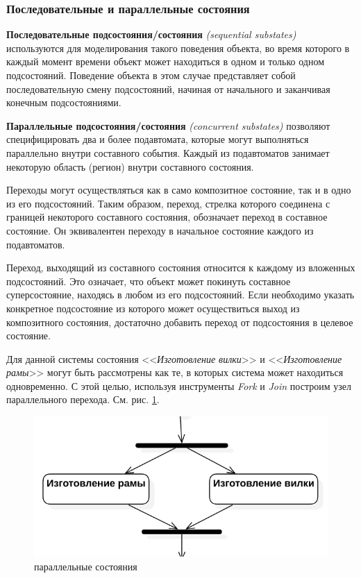 \documentclass[a4paper,12pt]{report}
\begin{document}
\subsubsection*{Последовательные и параллельные состояния}

\textbf{Последовательные подсостояния/состояния} \textit{(sequential substates)} используются для моделирования такого поведения объекта, во время которого в каждый момент времени объект может находиться в одном и только одном подсостояний. Поведение объекта в этом случае представляет собой последовательную смену подсостояний, начиная от начального и заканчивая конечным подсостояниями.

\textbf{Параллельные подсостояния/состояния} \textit{(concurrent substates)} позволяют специфицировать два и более подавтомата, которые могут выполняться параллельно внутри составного события. Каждый из подавтоматов занимает некоторую область (регион) внутри составного состояния.

Переходы могут осуществляться как в само композитное состояние, так и в одно из его подсостояний. Таким образом, переход, стрелка которого соединена с границей некоторого составного состояния, обозначает переход в составное состояние. Он эквивалентен переходу в начальное состояние каждого из подавтоматов.

Переход, выходящий из составного состояния относится к каждому из вложенных подсостояний. Это означает, что объект может покинуть составное суперсостояние, находясь в любом из его подсостояний. Если необходимо указать конкретное подсостояние из которого может осуществиться выход из композитного состояния, достаточно добавить переход от подсостояния в целевое состояние.

Для данной системы состояния <<\textit{Изготовление вилки}>> и <<\textit{Изготовление рамы}>> могут быть рассмотрены как те, в которых система может находиться одновременно. С этой целью, используя инструменты \textit{Fork} и \textit{Join} построим узел параллельного перехода. См. рис. \ref{fig:statechartparallel}.
\begin{figure}[h!]
	\centering
	\includegraphics[width=0.5\linewidth]{images/statechartparallel}
	\caption{параллельные состояния}
	\label{fig:statechartparallel}
\end{figure}
\end{document}
